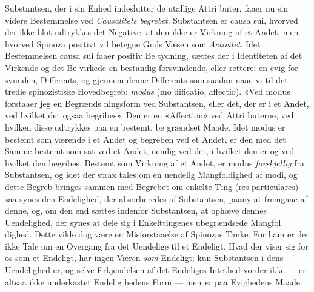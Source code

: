 \documentclass[12pt,a4paper]{book}
\begin{document}
Substantsen, der i sin Enhed indeslutter de utallige Attri\-%
buter, faaer nu sin videre Bestemmelse ved \emph{Causalitets\-%
begrebet}. Substantsen er causa sui, hvorved der ikke blot
udtrykkes det Negative, at den ikke er Virkning af et Andet,
men hvorved Spinoza positivt vil betegne Guds Væsen som
\emph{Activitet}. Idet Bestemmelsen causa sui faaer positiv Be\-%
tydning, sættes der i Identiteten af det Virkende og det Be\-%
virkede en bestandig forsvindende, eller rettere: en evig for\-%
svunden, Differents, og gjennem denne Differents som saadan
naae vi til det tredie spinozistiske Hovedbegreb: \emph{modus} (mo\-%
dificatio, affectio). «Ved modus forstaaer jeg en Begrænds\-%
ningsform ved Substantsen, eller det, der er i et Andet, ved
hvilket det ogsaa begribes». Den er en «Affection» ved Attri\-%
buterne, ved hvilken disse udtrykkes paa en bestemt, be\-%
grændset Maade. Idet modus er bestemt som værende i et
Andet og begreben ved et Andet, er den med det Samme
bestemt som sat ved et Andet, nemlig ved det, i hvilket den
er og ved hvilket den begribes. Bestemt som Virkning af et
Andet, er modus \emph{forskjellig} fra Substantsen, og idet der
strax tales om en uendelig Mangfoldighed af modi, og dette
Begreb bringes sammen med Begrebet om enkelte Ting (res
particulares) saa synes den Endelighed, der absorberedes af
Substantsen, paany at fremgaae af denne, og, om den end
sættes indenfor Substantsen, at ophæve dennes Uendelighed,
der synes at dele sig i Enkelttingenes ubegrændsede Mangfol\-%
dighed. Dette vilde dog være en Misforstaaelse af Spinozas
Tanke. For ham er der ikke Tale om en Overgang fra det
Uendelige til et Endeligt. Hvad der viser sig for os som et
Endeligt, har ingen Væren \emph{som} Endeligt; kun Substantsen i
dens Uendelighed er, og selve Erkjendelsen af det Endeliges
Intethed vorder ikke --- er altsaa ikke underkastet Endelig\-%
hedens Form --- men \emph{er} paa Evighedens Maade.
\end{document}
